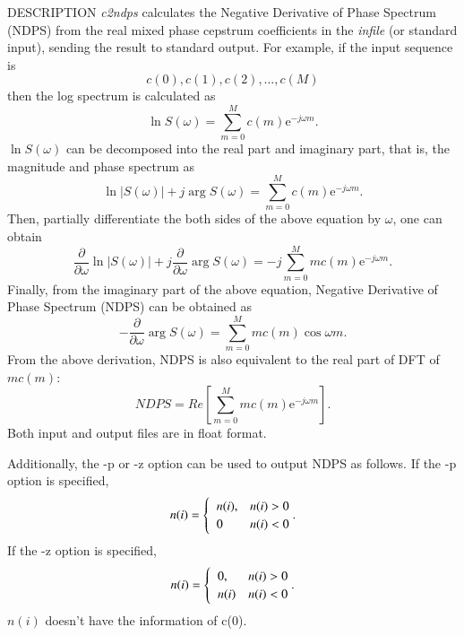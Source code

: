 \begin{synopsis}
 \item[c2ndps] [ --l $L$ ] [ --m $M$ ] [ {\em infile} ]
\end{synopsis}

\begin{qsection}{DESCRIPTION}
{\em c2ndps} calculates the Negative Derivative of Phase Spectrum (NDPS)
from the real mixed phase cepstrum coefficients in the {\em infile} (or standard input),
sending the result to standard output.
For example, if the input sequence is
\begin{displaymath}
   c(0),c(1),c(2),\dots,c(M)
\end{displaymath}
then the log spectrum is calculated as
\begin{displaymath}
\ln S(\omega) = \sum^{M}_{m=0}c(m)\mathrm{e}^{-j\omega m}.
\end{displaymath}
$\ln S(\omega)$ can be decomposed into the real part and imaginary part, that is, the magnitude and phase spectrum as
\begin{displaymath}
 \ln |S(\omega)| + j\arg S(\omega) = \sum^{M}_{m=0}c(m)\mathrm{e}^{-j\omega m}.
\end{displaymath}
 Then, partially differentiate the both sides of the above equation by $\omega$, one can obtain
\begin{displaymath}
 \frac{\partial}{\partial \omega}\ln |S(\omega)| + j\frac{\partial}{\partial \omega}\arg S(\omega) = -j \sum^{M}_{m=0}mc(m)\mathrm{e}^{-j\omega m}.
\end{displaymath}
 Finally, from the imaginary part of the above equation, Negative Derivative of Phase Spectrum (NDPS) can be obtained as
\begin{displaymath}
 -\frac{\partial}{\partial \omega}\arg S(\omega) = \sum^{M}_{m=0}mc(m)\cos \omega m.
\end{displaymath}
 From the above derivation, NDPS is also equivalent to the real part of DFT of $mc(m)$:
\begin{displaymath}
 NDPS = Re\left[ \sum^{M}_{m=0}mc(m)\mathrm{e}^{-j\omega m} \right] .
\end{displaymath}
Both input and output files are in float format.

Additionally, the -p or -z option can be used to output NDPS as follows.
If the -p option is specified,
\begin{align}
n(i) = \begin{cases} \;\; \displaystyle
	n(i), & n(i) > 0 \\
	\;\;\displaystyle 0 & n(i) < 0
       \end{cases}. \notag
\end{align}
If the -z option is specified,
\begin{align}
n(i) = \begin{cases} \;\; \displaystyle
	0, & n(i) > 0 \\
	\;\;\displaystyle n(i) & n(i) < 0
       \end{cases}. \notag
\end{align}
$n(i)$ doesn't have the information of c(0).
\end{qsection}

